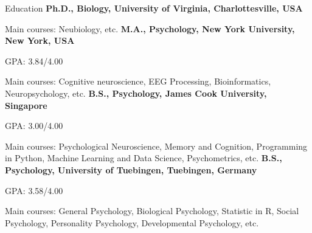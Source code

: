 \begin{rubric}{Education}
%
    \textbf{Ph.D., Biology, University of Virginia, Charlottesville, USA }\par
    Main courses: Neubiology, etc.
%
%
    \textbf{M.A., Psychology, New York University, New York, USA }\par
    GPA: 3.84/4.00 \par
    Main courses: Cognitive neuroscience, EEG Processing, Bioinformatics, Neuropsychology, etc.
%
%
    \textbf{B.S., Psychology, James Cook University, Singapore }\par
    GPA: 3.00/4.00 \par
    Main courses: Psychological Neuroscience, Memory and Cognition, Programming in Python, Machine Learning and Data Science, Psychometrics, etc.
%
%
    \textbf{B.S., Psychology, University of Tuebingen, Tuebingen, Germany }\par
    GPA: 3.58/4.00 \par
    Main courses: General Psychology, Biological Psychology, Statistic in R, Social Psychology, Personality Psychology, Developmental Psychology, etc.
\end{rubric}